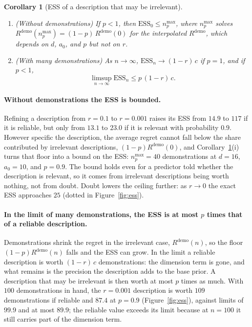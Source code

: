 \documentclass{article}
\newtheorem{corollary}[theorem]{Corollary}
\newcommand{\ess}{\mathrm{ESS}}
\begin{document}
\begin{corollary}[ESS of a description that may be irrelevant]\label{cor:ess}
\leavevmode
\begin{enumerate}[nosep]
    \item[(i)] (Without demonstrations) If $p < 1$, then $\ess_0 \le n^{\max}_p$, where $n^{\max}_p$ solves $R^{\mathrm{demo}}(n^{\max}_p) = (1-p)\,R^{\mathrm{demo}}(0)$ for the interpolated $R^{\mathrm{demo}}$, which depends on $d$, $a_0$, and $p$ but not on $r$.
    \item[(ii)] (With many demonstrations) As $n \to \infty$, $\ess_n \to (1-r)\,c$ if $p = 1$, and if $p < 1$,
    \[ \limsup_{n \to \infty} \ess_n \le p\,(1-r)\,c . \]
\end{enumerate}
\end{corollary}

\paragraph{Without demonstrations the ESS is bounded.} Refining a description from $r = 0.1$ to $r = 0.001$ raises its ESS from $14.9$ to $117$ if it is reliable, but only from $13.1$ to $23.0$ if it is relevant with probability $0.9$. However specific the description, the average regret cannot fall below the share contributed by irrelevant descriptions, $(1-p)R^{\mathrm{demo}}(0)$, and Corollary~\ref{cor:ess}(i) turns that floor into a bound on the ESS: $n^{\max}_p = 40$ demonstrations at $d = 16$, $a_0 = 10$, and $p = 0.9$. The bound holds even for a predictor told whether the description is relevant, so it comes from irrelevant descriptions being worth nothing, not from doubt. Doubt lowers the ceiling further: as $r \to 0$ the exact ESS approaches $25$ (dotted in Figure~\ref{fig:ess}).

\paragraph{In the limit of many demonstrations, the ESS is at most $p$ times that of a reliable description.} Demonstrations shrink the regret in the irrelevant case, $R^{\mathrm{demo}}(n)$, so the floor $(1-p)R^{\mathrm{demo}}(n)$ falls and the ESS can grow. In the limit a reliable description is worth $(1-r)\,c$ demonstrations: the dimension term is gone, and what remains is the precision the description adds to the base prior. A description that may be irrelevant is then worth at most $p$ times as much. With $100$ demonstrations in hand, the $r = 0.001$ description is worth $109$ demonstrations if reliable and $87.4$ at $p = 0.9$ (Figure~\ref{fig:ess}), against limits of $99.9$ and at most $89.9$; the reliable value exceeds its limit because at $n = 100$ it still carries part of the dimension term.
\end{document}
